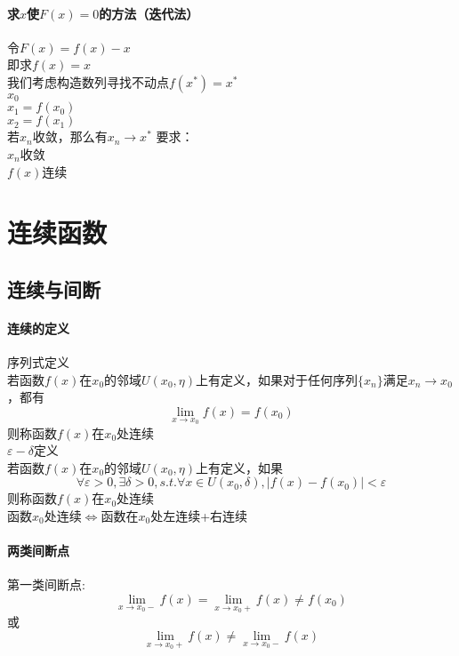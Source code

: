 \documentclass[11pt,hyperref,a4paper,UTF8]{ctexart}
\begin{document}
\begin{CJK}{UTF8}{gkai}
\paragraph{求$x$使$F(x)=0$的方法（迭代法）\\}
令$F(x)=f(x)-x$\\
即求$f(x)=x$\\
我们考虑构造数列寻找不动点$f(x^*)=x^*$\\
$x_0$\\
$x_1=f(x_0)$\\
$x_2=f(x_1)$\\
若$x_n$收敛，那么有$x_n\to x^*$
要求：\\
${x_n}$收敛\\
$f(x)$连续\\

\newpage
\section{连续函数}
\subsection{连续与间断}
\paragraph{连续的定义\\}
序列式定义\\
若函数$f(x)$在$x_0$的邻域$U(x_0,\eta)$上有定义，如果对于任何序列$\{x_n\}$满足$x_n\to x_0$，都有\\
\[\lim_{x\to x_0}f(x)=f(x_0)\]
则称函数$f(x)$在$x_0$处连续\\


$\varepsilon-\delta$定义\\
若函数$f(x)$在$x_0$的邻域$U(x_0,\eta)$上有定义，如果\\
\[\forall \varepsilon>0,\exists \delta>0,s.t. \forall x\in U(x_0,\delta),|f(x)-f(x_0)|<\varepsilon\]
则称函数$f(x)$在$x_0$处连续\\

函数$x_0$处连续$\Leftrightarrow$函数在$x_0$处左连续+右连续\\
\paragraph{两类间断点\\}
第一类间断点:
\[\lim_{x\to x_0-}f(x) = \lim_{x\to x_0+} f(x)\neq f(x_0)\]
或\[\lim_{x\to x_0+}f(x)\neq \lim_{x\to x_0-}f(x)\]


\end{CJK}
\end{document}

